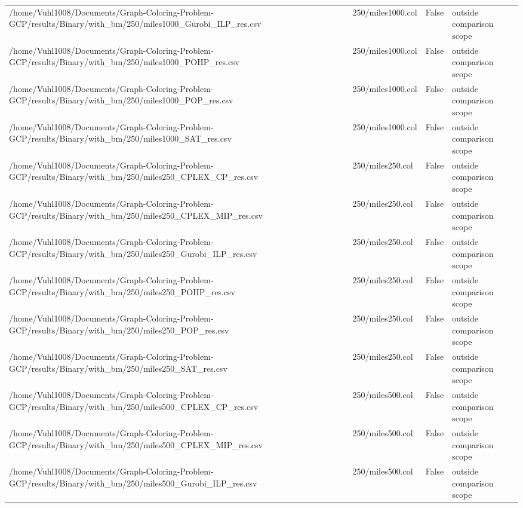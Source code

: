 \begin{table}[htbp]
\begin{tabular}{llll}
/home/Vuhl1008/Documents/Graph-Coloring-Problem-GCP/results/Binary/with\_bm/250/miles1000\_Gurobi\_ILP\_res.csv & 250/miles1000.col & False & outside comparison scope \\
/home/Vuhl1008/Documents/Graph-Coloring-Problem-GCP/results/Binary/with\_bm/250/miles1000\_POHP\_res.csv & 250/miles1000.col & False & outside comparison scope \\
/home/Vuhl1008/Documents/Graph-Coloring-Problem-GCP/results/Binary/with\_bm/250/miles1000\_POP\_res.csv & 250/miles1000.col & False & outside comparison scope \\
/home/Vuhl1008/Documents/Graph-Coloring-Problem-GCP/results/Binary/with\_bm/250/miles1000\_SAT\_res.csv & 250/miles1000.col & False & outside comparison scope \\
/home/Vuhl1008/Documents/Graph-Coloring-Problem-GCP/results/Binary/with\_bm/250/miles250\_CPLEX\_CP\_res.csv & 250/miles250.col & False & outside comparison scope \\
/home/Vuhl1008/Documents/Graph-Coloring-Problem-GCP/results/Binary/with\_bm/250/miles250\_CPLEX\_MIP\_res.csv & 250/miles250.col & False & outside comparison scope \\
/home/Vuhl1008/Documents/Graph-Coloring-Problem-GCP/results/Binary/with\_bm/250/miles250\_Gurobi\_ILP\_res.csv & 250/miles250.col & False & outside comparison scope \\
/home/Vuhl1008/Documents/Graph-Coloring-Problem-GCP/results/Binary/with\_bm/250/miles250\_POHP\_res.csv & 250/miles250.col & False & outside comparison scope \\
/home/Vuhl1008/Documents/Graph-Coloring-Problem-GCP/results/Binary/with\_bm/250/miles250\_POP\_res.csv & 250/miles250.col & False & outside comparison scope \\
/home/Vuhl1008/Documents/Graph-Coloring-Problem-GCP/results/Binary/with\_bm/250/miles250\_SAT\_res.csv & 250/miles250.col & False & outside comparison scope \\
/home/Vuhl1008/Documents/Graph-Coloring-Problem-GCP/results/Binary/with\_bm/250/miles500\_CPLEX\_CP\_res.csv & 250/miles500.col & False & outside comparison scope \\
/home/Vuhl1008/Documents/Graph-Coloring-Problem-GCP/results/Binary/with\_bm/250/miles500\_CPLEX\_MIP\_res.csv & 250/miles500.col & False & outside comparison scope \\
/home/Vuhl1008/Documents/Graph-Coloring-Problem-GCP/results/Binary/with\_bm/250/miles500\_Gurobi\_ILP\_res.csv & 250/miles500.col & False & outside comparison scope \\

\end{tabular}
\end{table}
